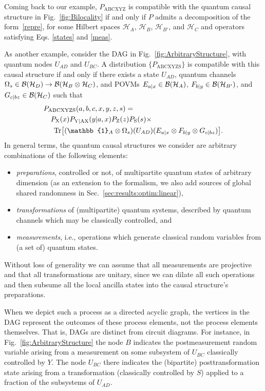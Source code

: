 \documentclass[superscriptaddress,aps,prx,nofootinbib,twocolumn,twoside,reprint,letterpaper,longbibliography]{revtex4-2}
\DeclarePairedDelimiter{\braks}{\lbrack}{\rbrack}
\def\id{\boldsymbol{\mathbb{1}}}
\DeclareMathOperator{\Tr}{Tr}
\def\H{{\mathcal H}}
\begin{document}
Coming back to our example, ${P_{\text{ABCXYZ}}}$ is compatible with the quantum causal structure in Fig.~\ref{fig:Bilocality} if and only if $P$ admits a decomposition of the form~\eqref{repre}, for some Hilbert spaces $\H_A$, $\H_B$, $\H_{B'}$, and $\H_C$ and operators satisfying Eqs. \eqref{states} and \eqref{meas}.

As another example, consider the DAG in Fig.~\ref{fig:ArbitraryStructure}, with quantum nodes $U_{AD}$ and $U_{BC}$.
A distribution ${\{P_{\text{ABCXYZS}}\}}$ is compatible with this causal structure if and only if there exists a state ${U_{AD}}$, quantum channels ${\Omega_s\in {\cal B}(\H_D)\to{\cal B}(\H_{B}\otimes \H_C) }$, and POVMs ${E_{a|x}\in {\cal B}(\H_A)}$, ${F_{b|y}\in {\cal B}(\H_{B'})}$, and ${G_{c|bz}\in{\cal B}(\H_{C})}$ such that
%
\begin{align}\label{eq:arbitrarycompat}
&P_{\text{ABCXYZS}}(a,b,c,x,y,z,s)=\nonumber\\
&\quad P_\text{X}(x)P_{\text{Y{\textbar}AX}}(y|a,x)P_\text{Z}(z)P_\text{S}(s)\times\\\nonumber
&\quad \;\Tr\braks*{(\id_A\otimes\Omega_s)(U_{AD})(E_{a|x}\otimes F_{b|y}\otimes G_{c|bz})}.
\end{align}
In general terms, the quantum causal structures we consider are arbitrary combinations of the following elements:

\begin{itemize}
    \item \textit{preparations}, controlled or not, of multipartite quantum states of arbitrary dimension (as an extension to the formalism, we also add sources of global shared randomness in Sec.~\ref{sec:results:optim:linear}),
    \item \textit{transformations} of (multipartite) quantum systems, described by quantum channels which may be classically controlled, and
    \item \textit{measurements}, i.e., operations which generate classical random variables from (a set of) quantum states.
\end{itemize}

Without loss of generality we can assume that all measurements are projective and that all transformations are unitary, since we can dilate all such operations and then subsume all the local ancilla states into the causal structure's preparations.

When we depict such a process as a directed acyclic graph, the vertices in the DAG represent the outcomes of these process elements, not the process elements themselves. That is, DAGs are distinct from circuit diagrams. For instance, in Fig.~\ref{fig:ArbitraryStructure} the node $B$ indicates the postmeasurement random variable arising from a measurement on some subsystem of $U_{BC}$ classically controlled by $Y$. The node $U_{BC}$ there indicates the (bipartite) posttransformation state arising from a transformation (classically controlled by $S$) applied to a fraction of the subsystems of $U_{AD}$.
\end{document}
